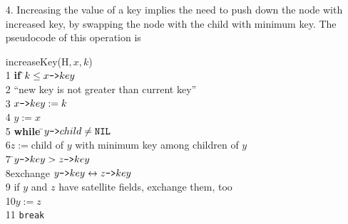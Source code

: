 \documentclass{article}
\begin{document}
\begin{enumerate}
\begin{enumerate}
\begin{center}
\end{center}
\end{enumerate}
\item[4.] Increasing the value of a key implies the need to push down the node with increased key, by swapping the node with the child with minimum key. The pseudocode of this operation is
\begin{tabbing}
increaseKey(H\(,x,k\))\\
1 {\bf if} \=$k\leq x\mbox{\tt->}key$\\
2 ``new key is not greater than current key''\\
3 $x\mbox{\tt->}key:=k$\\
4 $y:=x$\\
5 {\bf while} \=$y\mbox{\tt->}child\neq\mbox{\tt NIL}$\\
6\>$z:=$child of $y$ with minimum key among children of $y$\\
7 \=$y\mbox{\tt->}key>z\mbox{\tt->}key$\\
8\>\>exchange $y\mbox{\tt->}key\leftrightarrow z\mbox{\tt->}key$\\
9\>\> if $y$ and $z$ have satellite fields, exchange them, too\\
10\>\>$y:=z$\\
11 {\tt break}\\


\end{tabbing}
\end{enumerate}
\end{document}
